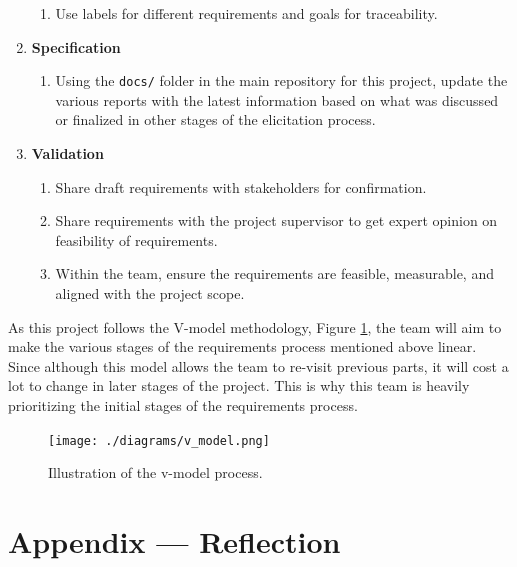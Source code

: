\documentclass[12pt]{article}
\theoremstyle{definition}
\begin{document}
\begin{enumerate}
\begin{enumerate}
        \item Use labels for different requirements and goals for traceability. 
    \end{enumerate}

    \item \textbf{Specification}
    \begin{enumerate}
        \item Using the \texttt{docs/} folder in the main repository for this
        project, update the various reports with the latest information based on
        what was discussed or finalized in other stages of the elicitation
        process. 
    \end{enumerate}

    \item \textbf{Validation}
    \begin{enumerate}
        \item Share draft requirements with stakeholders for confirmation. 
        \item Share requirements with the project supervisor to get expert
        opinion on feasibility of requirements. 
        \item Within the team, ensure the requirements are feasible, measurable,
        and aligned with the project scope. 
    \end{enumerate}
\end{enumerate}


As this project follows the V-model methodology, Figure
\ref{fig:v-model-process}, the team will aim to make the various stages of the
requirements process mentioned above linear. Since although this model allows
the team to re-visit previous parts, it will cost a lot to change in later
stages of the project. This is why this team is heavily prioritizing the initial
stages of the requirements process. 

\begin{figure}[H]
    \centering
    \texttt{[image: ./diagrams/v\_model.png]}
    \caption{Illustration of the v-model process.}
    \label{fig:v-model-process}
\end{figure}

\newpage



\newpage
\section*{Appendix --- Reflection}


\end{document}
